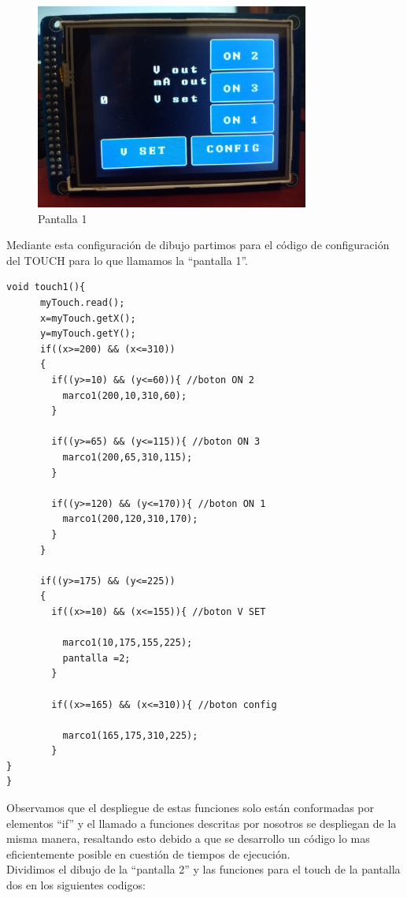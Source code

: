 \begin{figure}[H]
\centering
\includegraphics[width=9cm]{Capitulo3/figs/pantalla1.jpg}
\caption{Pantalla 1}
\end{figure}

Mediante esta configuración de dibujo partimos para el código de configuración del TOUCH para lo que llamamos la ``pantalla 1''.

\begin{verbatim}
void touch1(){ 
      myTouch.read();
      x=myTouch.getX();
      y=myTouch.getY();
      if((x>=200) && (x<=310))
      {
        if((y>=10) && (y<=60)){ //boton ON 2
          marco1(200,10,310,60);
        }
        
        if((y>=65) && (y<=115)){ //boton ON 3
          marco1(200,65,310,115);
        }
        
        if((y>=120) && (y<=170)){ //boton ON 1
          marco1(200,120,310,170);
        }
      }
      
      if((y>=175) && (y<=225))
      {
        if((x>=10) && (x<=155)){ //boton V SET
        
          marco1(10,175,155,225);
          pantalla =2;
        }
      
        if((x>=165) && (x<=310)){ //boton config
        
          marco1(165,175,310,225);
        }
}
}
\end{verbatim}

Observamos que el despliegue de estas funciones solo están conformadas por elementos ``if'' y el llamado a funciones descritas por nosotros se despliegan de la misma manera, resaltando esto debido a que se desarrollo un código lo mas eficientemente posible en cuestión de tiempos de ejecución. \\

Dividimos el dibujo de la ``pantalla 2'' y las funciones para el touch de la pantalla dos en los siguientes codigos:\\

